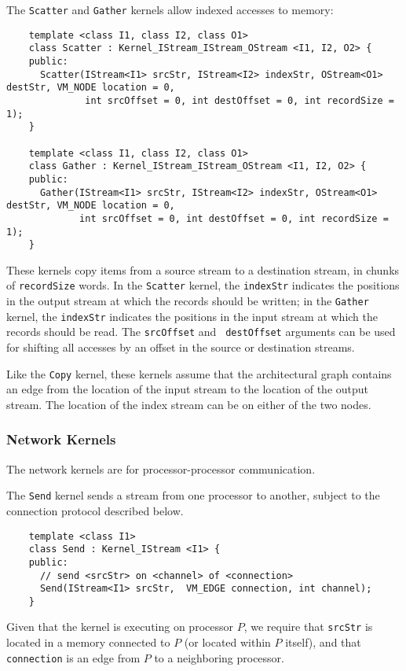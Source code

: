  The {\tt Scatter} and {\tt Gather} kernels allow
indexed accesses to memory:
{\small
\begin{verbatim}
    template <class I1, class I2, class O1>
    class Scatter : Kernel_IStream_IStream_OStream <I1, I2, O2> {
    public:
      Scatter(IStream<I1> srcStr, IStream<I2> indexStr, OStream<O1> destStr, VM_NODE location = 0,
              int srcOffset = 0, int destOffset = 0, int recordSize = 1);
    }

    template <class I1, class I2, class O1>
    class Gather : Kernel_IStream_IStream_OStream <I1, I2, O2> {
    public:
      Gather(IStream<I1> srcStr, IStream<I2> indexStr, OStream<O1> destStr, VM_NODE location = 0,
             int srcOffset = 0, int destOffset = 0, int recordSize = 1);
    }  
\end{verbatim}}

These kernels copy items from a source stream to a destination stream,
in chunks of {\tt recordSize} words.  In the {\tt Scatter} kernel,
the {\tt indexStr} indicates the positions in the output stream at
which the records should be written; in the {\tt Gather} kernel, the
{\tt indexStr} indicates the positions in the input stream at which
the records should be read.  The {\tt srcOffset} and {\tt
destOffset} arguments can be used for shifting all accesses by an
offset in the source or destination streams.

Like the {\tt Copy} kernel, these kernels assume that the
architectural graph contains an edge from the location of the input
stream to the location of the output stream.  The location of the
index stream can be on either of the two nodes.

\subsubsection*{Network Kernels}

The network kernels are for processor-processor communication.

 The {\tt Send} kernel sends a stream from one processor to
another, subject to the connection protocol described below.
{\small
\begin{verbatim}
    template <class I1>
    class Send : Kernel_IStream <I1> {
    public:
      // send <srcStr> on <channel> of <connection>
      Send(IStream<I1> srcStr,  VM_EDGE connection, int channel);
    }
\end{verbatim}}

Given that the kernel is executing on processor $P$, we require that
{\tt srcStr} is located in a memory connected to $P$ (or located
within $P$ itself), and that {\tt connection} is an edge from $P$ to a
neighboring processor.


